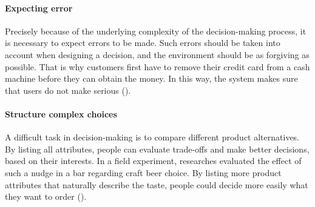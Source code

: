 \paragraph{Expecting error}
Precisely because of the underlying complexity of the decision-making process, it is necessary to expect errors to be made. Such errors should be taken into account when designing a decision, and the environment should be as forgiving as possible. That is why customers first have to remove their credit card from a cash machine before they can obtain the money. In this way, the system makes sure that users do not make serious (\cite{weinmann_digital_2016}).
\paragraph{Structure complex choices}
A difficult task in decision-making is to compare different product alternatives. By listing all attributes, people can evaluate trade-offs and make better decisions, based on their interests. In a field experiment, researches evaluated the effect of such a nudge in a bar regarding craft beer choice. By listing more product attributes that naturally describe the taste, people could decide more easily what they want to order (\cite{malone_excessive_2017}).


